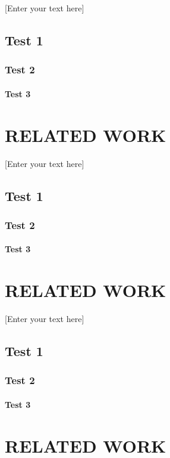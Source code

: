 \documentclass[oneside,11pt]{memoir}
\begin{document}
\DoubleSpacing
\setlength{\parindent}{.5in}
[Enter your text here]
\section{Test 1}
\subsection{Test 2}
\subsubsection{Test 3}
\clearpage


\chapter{RELATED WORK} 

\DoubleSpacing
\setlength{\parindent}{.5in}
[Enter your text here]
\section{Test 1}
\subsection{Test 2}
\subsubsection{Test 3}
\clearpage



\chapter{RELATED WORK} 

\DoubleSpacing
\setlength{\parindent}{.5in}
[Enter your text here]
\section{Test 1}
\subsection{Test 2}
\subsubsection{Test 3}
\clearpage




\chapter{RELATED WORK} 
\end{document}
